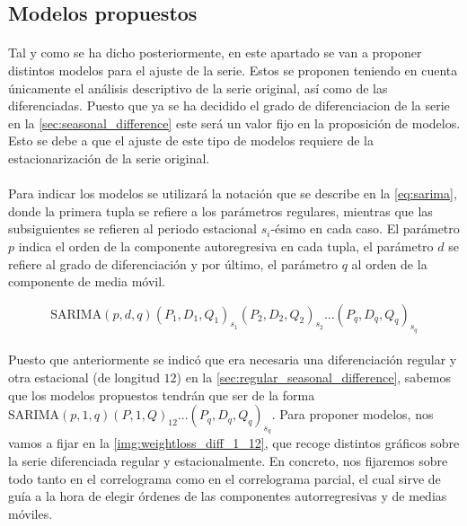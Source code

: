 \documentclass[a4paper, spanish]{article}
\begin{document}
    \subsection{Modelos propuestos}
    \label{sec:proposed_models}

      \paragraph{}
      Tal y como se ha dicho posteriormente, en este apartado se van a proponer distintos modelos para el ajuste de la serie. Estos se proponen teniendo en cuenta únicamente el análisis descriptivo de la serie original, así como de las diferenciadas. Puesto que ya se ha decidido el grado de diferenciacion de la serie en la \autoref{sec:seasonal_difference} este será un valor fijo en la proposición de modelos. Esto se debe a que el ajuste de este tipo de modelos requiere de la estacionarización de la serie original.

      \paragraph{}
      Para indicar los modelos se utilizará la notación que se describe en la \autoref{eq:sarima}, donde la primera tupla se refiere a los parámetros regulares, mientras que las subsiguientes se refieren al periodo estacional $s_i$-ésimo en cada caso. El parámetro $p$ indica el orden de la componente autoregresiva en cada tupla, el parámetro $d$ se refiere al grado de diferenciación y por último, el parámetro $q$ al orden de la componente de media móvil.

      \begin{equation}
      \label{eq:sarima}
        \text{SARIMA}(p, d, q)(P_1, D_1, Q_1)_{s_1}(P_2, D_2, Q_2)_{s_2}...(P_q, D_q, Q_q)_{s_q}
      \end{equation}

      \paragraph{}
      Puesto que anteriormente se indicó que era necesaria una diferenciación regular y otra estacional (de longitud $12$) en la \autoref{sec:regular_seasonal_difference}, sabemos que los modelos propuestos tendrán que ser de la forma $\text{SARIMA}(p, 1, q)(P, 1, Q)_{12}...(P_q, D_q, Q_q)_{s_q}$. Para proponer modelos, nos vamos a fijar en la \autoref{img:weightloss_diff_1_12}, que recoge distintos gráficos sobre la serie diferenciada regular y estacionalmente. En concreto, nos fijaremos sobre todo tanto en el correlograma como en el correlograma parcial, el cual sirve de guía a la hora de elegir órdenes de las componentes autorregresivas y de medias móviles.
\end{document}
